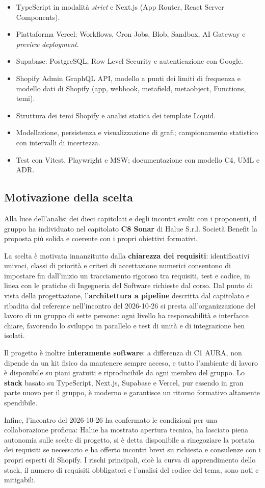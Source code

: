 \begin{itemize}
    \item TypeScript in modalità \emph{strict} e Next.js (App Router, React Server Components).
    \item Piattaforma Vercel: Workflows, Cron Jobs, Blob, Sandbox, AI Gateway e \emph{preview deployment}.
    \item Supabase: PostgreSQL, Row Level Security e autenticazione con Google.
    \item Shopify Admin GraphQL API, modello a punti dei limiti di frequenza e modello dati di Shopify (app, webhook, metafield, metaobject, Functions, temi).
    \item Struttura dei temi Shopify e analisi statica dei template Liquid.
    \item Modellazione, persistenza e visualizzazione di grafi; campionamento statistico con intervalli di incertezza.
    \item Test con Vitest, Playwright e MSW; documentazione con modello C4, UML e ADR.
\end{itemize}

\subsection{Motivazione della scelta}

Alla luce dell'analisi dei dieci capitolati e degli incontri svolti con i proponenti, il gruppo ha individuato nel capitolato \textbf{C8 Sonar} di Halue S.r.l. Società Benefit la proposta più solida e coerente con i propri obiettivi formativi.

La scelta è motivata innanzitutto dalla \textbf{chiarezza dei requisiti}: identificativi univoci, classi di priorità e criteri di accettazione numerici consentono di impostare fin dall'inizio un tracciamento rigoroso tra requisiti, test e codice, in linea con le pratiche di Ingegneria del Software richieste dal corso. Dal punto di vista della progettazione, l'\textbf{architettura a pipeline} descritta dal capitolato e ribadita dal referente nell'incontro del 2026-10-26 si presta all'organizzazione del lavoro di un gruppo di sette persone: ogni livello ha responsabilità e interfacce chiare, favorendo lo sviluppo in parallelo e test di unità e di integrazione ben isolati.

Il progetto è inoltre \textbf{interamente software}: a differenza di C1 AURA, non dipende da un kit fisico da mantenere sempre acceso, e tutto l'ambiente di lavoro è disponibile su piani gratuiti e riproducibile da ogni membro del gruppo. Lo \textbf{stack} basato su TypeScript, Next.js, Supabase e Vercel, pur essendo in gran parte nuovo per il gruppo, è moderno e garantisce un ritorno formativo altamente spendibile.

Infine, l'incontro del 2026-10-26 ha confermato le condizioni per una collaborazione proficua: Halue ha mostrato apertura tecnica, ha lasciato piena autonomia sulle scelte di progetto, si è detta disponibile a rinegoziare la portata dei requisiti se necessario e ha offerto incontri brevi su richiesta e consulenze con i propri esperti di Shopify. I rischi principali, cioè la curva di apprendimento dello stack, il numero di requisiti obbligatori e l'analisi del codice del tema, sono noti e mitigabili.
